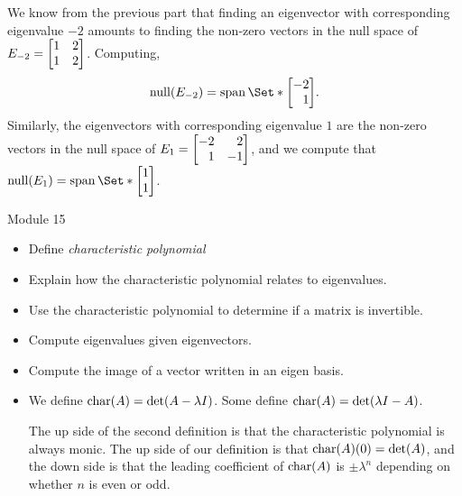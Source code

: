 \documentclass{workbook}
\begin{document}
\begin{slide}
\begin{parts}
\begin{solution}
				We know from the previous part that finding an eigenvector with
				corresponding eigenvalue $-2$ amounts to finding the non-zero
				vectors	in the null space of
				$E_{-2}=\mat{1&2\\1&2}$. Computing,
				\[\Null(E_{-2})=\Span\Set*{\mat{-2\\1}}.\]
				Similarly, the eigenvectors with corresponding eigenvalue $1$ are
				the non-zero vectors in the null space of $E_1=\mat{-2&2\\1&-1}$,
				and we compute that $\Null(E_1)=\Span\Set*{\mat{1\\1}}$.
			\end{solution}
	\end{parts}

\end{slide}
\begin{lesson}

	Module 15

	\begin{itemize}
		\item Define \emph{characteristic polynomial}
		\item Explain how the characteristic polynomial relates to eigenvalues.
		\item Use the characteristic polynomial to determine if a matrix is invertible.
		\item Compute eigenvalues given eigenvectors.
		\item Compute the image of a vector written in an eigen basis.
	\end{itemize}

	\begin{annotation}
		\begin{notes}
			\begin{itemize}
				\item We define $\operatorname{char}(A)=\det(A-\lambda I)$.
					Some define $\operatorname{char}(A)=\det(\lambda I-A)$.

					The up side of the second definition is
					that the characteristic polynomial is always monic.
					The up side of our definition is that
					$\operatorname{char}(A)(0)=\det(A)$, and the down side is that
					the leading coefficient of $\operatorname{char}(A)$ is $\pm\lambda^n$ depending
					on whether $n$ is even or odd.


\end{itemize}
\end{notes}
\end{annotation}
\end{lesson}
\end{document}

